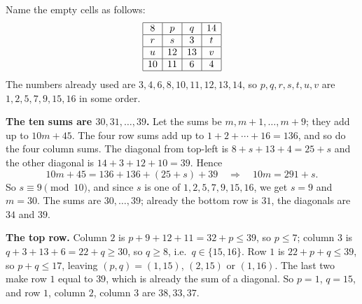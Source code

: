 Name the empty cells as follows:
\[
\begin{array}{|c|c|c|c|}
\hline 8 & p & q & 14\\
\hline r & s & 3 & t\\
\hline u & 12 & 13 & v\\
\hline 10 & 11 & 6 & 4\\
\hline
\end{array}
\]
The numbers already used are $3,4,6,8,10,11,12,13,14$, so $p,q,r,s,t,u,v$ are $1,2,5,7,9,15,16$ in some order.

\textbf{The ten sums are $30,31,\dots,39$.} Let the sums be $m,m+1,\dots,m+9$; they add up to $10m+45$. The four row sums add up to $1+2+\cdots+16=136$, and so do the four column sums. The diagonal from top-left is $8+s+13+4=25+s$ and the other diagonal is $14+3+12+10=39$. Hence
\[
10m+45=136+136+(25+s)+39\quad\Longrightarrow\quad 10m=291+s .
\]
So $s\equiv9\pmod{10}$, and since $s$ is one of $1,2,5,7,9,15,16$, we get $s=9$ and $m=30$. The sums are $30,\dots,39$; already the bottom row is $31$, the diagonals are $34$ and $39$.

\textbf{The top row.} Column $2$ is $p+9+12+11=32+p\le39$, so $p\le7$; column $3$ is $q+3+13+6=22+q\ge30$, so $q\ge8$, i.e.\ $q\in\{15,16\}$. Row $1$ is $22+p+q\le39$, so $p+q\le17$, leaving $(p,q)=(1,15)$, $(2,15)$ or $(1,16)$. The last two make row $1$ equal to $39$, which is already the sum of a diagonal. So $p=1$, $q=15$, and row $1$, column $2$, column $3$ are $38,33,37$.

